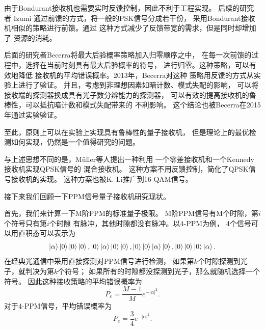 由于Bondurant接收机也需要实时反馈控制，因此不利于工程实现。
后续的研究者 Izumi 通过前馈的方式，将一般的PSK信号分成若干份，
采用Bondurant接收机相似的策略进行前馈\cite{izumi2012displacement}。通过
这种方式减少了反馈带宽的需求，但是同时却增加了
资源的消耗。

后面的研究者Becerra将最大后验概率策略加入归零顺序之中，
在每一次前馈的过程中，选择在当前时刻具有最大后验概率的符号，
进行归零\cite{becerra2011m}。这种策略，可以有效地降低
接收机的平均错误概率。2013年，Becerra对这种
策略用反馈的方式从实验上进行了验证\cite{becerra2013experimental}。
并且，考虑到非理想因素如暗计数、模式失配的影响，
可以将接收端的探测器换成具有光子数分辨能力的探测器，
可以有效的提高接收机的鲁棒性，可以抵抗暗计数和模式失配带来的
不利影响\cite{izumi2013quantum,li2013suppressing}。
这个结论也被Becerra在2015年通过实验验证\cite{becerra2015photon}。

至此，原则上可以在实验上实现具有鲁棒性的量子接收机，
但是理论上的最优检测如何实现，仍然是一个值得研究的问题。

与上述思想不同的是，M{\"u}ller等人提出一种利用
一个零差接收机和一个Kennedy接收机实现QPSK信号的
混合接收机\cite{muller2012quadrature}。
这种方案不用反馈控制，简化了QPSK信号接收机的实现。
这种方案也被K. Li推广到16-QAM信号\cite{李科2014}。

接下来我们回顾一下PPM信号量子接收机研究现状。

首先，我们来计算一下M阶PPM的标准量子极限。
M阶PPM信号有M个时隙，第$i$个符号只有第$i$个时隙
有脉冲，其他时隙都没有脉冲。以4-PPM为例，
4个信号可以用直积态可以表示为
\begin{equation}
\ket{\alpha}\ket{0}\ket{0}\ket{0}, \ket{0}\ket{\alpha}\ket{0}\ket{0},\ket{0}\ket{0}\ket{\alpha}\ket{0}, \ket{0}\ket{0}\ket{0}\ket{\alpha}.
\end{equation}
在经典光通信中采用直接探测对PPM信号进行检测，
如果第$k$个时隙探测到光子，就判决为第$k$个符号；
如果所有的时隙都没探测到光子，那么就随机选择一个符号。
因此这种接收策略的平均错误概率为
\begin{equation}
P_e = \frac{M-1}{M} e^{-|\alpha|^2}.
\end{equation}
对于4-PPM信号，平均错误概率为
\begin{equation}
P_e = \frac{3}{4} e^{-|\alpha|^2}.
\end{equation}

